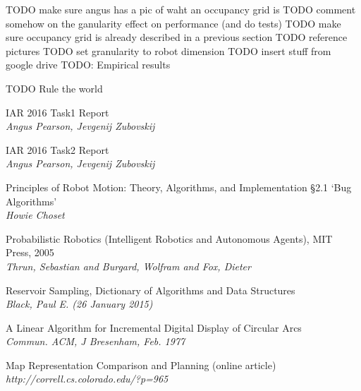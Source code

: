 \documentclass[11pt, a4paper]{article}
\begin{document}





TODO make sure angus has a pic of waht an occupancy grid is
TODO comment somehow on the ganularity effect on performance (and do tests)
TODO make sure occupancy grid is already described in a previous section
TODO reference pictures
TODO set granularity to robot dimension
TODO insert stuff from google drive
TODO: Empirical results


TODO Rule the world



\begin{thebibliography}{}

\par{IAR 2016 Task1 Report}
\\
\textit{Angus Pearson, Jevgenij Zubovskij}

\par{IAR 2016 Task2 Report}
\\
\textit{Angus Pearson, Jevgenij Zubovskij}


\par{Principles of Robot Motion: Theory, Algorithms, and Implementation \S2.1 `Bug Algorithms'}
\\
\textit{Howie Choset}


\par{Probabilistic Robotics (Intelligent Robotics and Autonomous Agents), MIT Press, 2005}
\\
\textit{Thrun, Sebastian and Burgard, Wolfram and Fox, Dieter}


\par{Reservoir Sampling, Dictionary of Algorithms and Data Structures}
\\
\textit{Black, Paul E. (26 January 2015)}


\par{A Linear Algorithm for Incremental Digital Display of Circular Arcs}
\\
\textit{Commun. ACM, J Bresenham, Feb. 1977}

\par{Map Representation Comparison and Planning (online article)}
\\
\textit{http://correll.cs.colorado.edu/?p=965}




\end{thebibliography}
\end{document}
